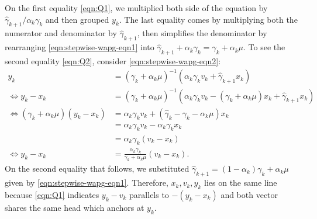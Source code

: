 \documentclass[12pt]{article}
\begin{document}
        On the first equality \eqref{eqn:Q1}, we multiplied both side of the equation by $\hat\gamma_{k + 1}/\alpha_k \gamma_k$ and then grouped $y_k$. 
        The last equality comes by multiplying both the numerator and denominator by $\hat \gamma_{k + 1}$, then simplifies the denominator by rearranging \eqref{eqn:stepwise-wapg-eqn1} into $\hat \gamma_{k + 1} + \alpha_k \gamma_k = \gamma_k + \alpha_k \mu$. 
        To see the second equality \eqref{eqn:Q2}, consider \eqref{eqn:stepwise-wapg-eqn2}: 
        \begin{align*}
            y_k &= (\gamma_k + \alpha_k \mu)^{-1}(\alpha_k \gamma_k v_k + \hat\gamma_{k + 1} x_k)
            \\
            \iff
            y_k - x_k &= 
            (\gamma_k + \alpha_k \mu)^{-1}
            (\alpha_k \gamma_k v_k - (\gamma_k + \alpha_k \mu)x_k + \hat \gamma_{k + 1} x_k)
            \\
            \iff 
            (\gamma_k + \alpha_k \mu)(y_k - x_k)
            &= 
            \alpha_k\gamma _kv_k + 
            (\hat \gamma_k - \gamma_k - \alpha_k \mu) x_k
            \\
            &= \alpha_k \gamma_k v_k - \alpha_k \gamma_k x_k 
            \\
            &= \alpha_k \gamma_k(v_k - x_k)
            \\
            \iff 
            y_k - x_k &= 
            \frac{\alpha_k \gamma_k}{\gamma_k + \alpha_k \mu}(v_k - x_k). 
        \end{align*}
        On the second equality that follows, we substituted $\hat\gamma_{k + 1} = (1 - \alpha_k)\gamma_k + \alpha_k \mu$ given by \eqref{eqn:stepwise-wapg-eqn1}. 
        Therefore, $x_k, v_k, y_k$ lies on the same line because \eqref{eqn:Q1} indicates $y_k - v_k$ parallels to $-(y_k - x_k)$ and both vector shares the same head which anchors at $y_k$. 
    
\end{document}
